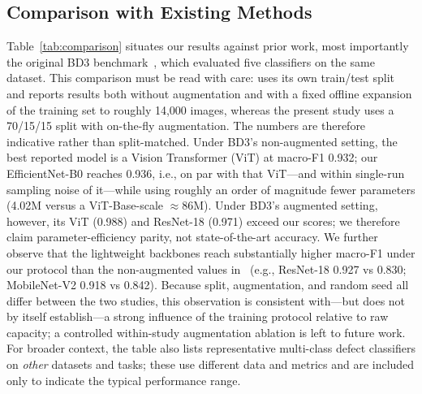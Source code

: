 \documentclass[conference]{IEEEtran}
\begin{document}
\subsection{Comparison with Existing Methods}
\label{sec:comparison}
Table~\ref{tab:comparison} situates our results against prior work, most importantly the original BD3 benchmark~\cite{ref40}, which evaluated five classifiers on the same dataset. This comparison must be read with care: \cite{ref40} uses its own train/test split and reports results both without augmentation and with a fixed offline expansion of the training set to roughly 14{,}000 images, whereas the present study uses a 70/15/15 split with on-the-fly augmentation. The numbers are therefore indicative rather than split-matched. Under BD3's non-augmented setting, the best reported model is a Vision Transformer (ViT) at macro-F1 0.932; our EfficientNet-B0 reaches 0.936, i.e., on par with that ViT---and within single-run sampling noise of it---while using roughly an order of magnitude fewer parameters (4.02M versus a ViT-Base-scale $\approx$86M). Under BD3's augmented setting, however, its ViT (0.988) and ResNet-18 (0.971) exceed our scores; we therefore claim parameter-efficiency parity, not state-of-the-art accuracy. We further observe that the lightweight backbones reach substantially higher macro-F1 under our protocol than the non-augmented values in~\cite{ref40} (e.g., ResNet-18 0.927 vs 0.830; MobileNet-V2 0.918 vs 0.842). Because split, augmentation, and random seed all differ between the two studies, this observation is consistent with---but does not by itself establish---a strong influence of the training protocol relative to raw capacity; a controlled within-study augmentation ablation is left to future work. For broader context, the table also lists representative multi-class defect classifiers on \emph{other} datasets and tasks; these use different data and metrics and are included only to indicate the typical performance range.
\end{document}
